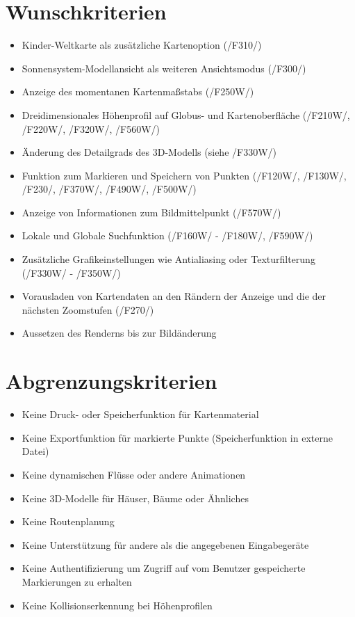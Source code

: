 \documentclass[10pt]{scrreprt}
\newcommand{\ziel}[1]{{\fontsize{9.5}{11}\textsf{/#1/}}}
\begin{document}
\section{Wunschkriterien}
\begin{itemize}
\item Kinder-Weltkarte als zusätzliche Kartenoption (\ziel{F310})
\item Sonnensystem-Modellansicht als weiteren Ansichtsmodus (\ziel{F300})
\item Anzeige des momentanen Kartenmaßstabs (\ziel{F250W})
\item Dreidimensionales Höhenprofil auf Globus- und Kartenoberfläche (\ziel{F210W}, \ziel{F220W}, \ziel{F320W}, \ziel{F560W})
\item Änderung des Detailgrads des 3D-Modells (siehe \ziel{F330W})
\item Funktion zum Markieren und Speichern von Punkten (\ziel{F120W}, \ziel{F130W}, \ziel{F230}, \ziel{F370W}, \ziel{F490W}, \ziel{F500W})
\item Anzeige von Informationen zum Bildmittelpunkt (\ziel{F570W})
\item Lokale und Globale Suchfunktion (\ziel{F160W} - \ziel{F180W}, \ziel{F590W})
\item Zusätzliche Grafikeinstellungen wie Antialiasing oder Texturfilterung (\ziel{F330W} - \ziel{F350W})
\item Vorausladen von Kartendaten an den Rändern der Anzeige und die der nächsten Zoomstufen (\ziel{F270})
\item Aussetzen des Renderns bis zur Bildänderung 
\end{itemize}

\section{Abgrenzungskriterien}
\begin{itemize}
\item Keine Druck- oder Speicherfunktion für Kartenmaterial
\item Keine Exportfunktion für markierte Punkte (Speicherfunktion in externe Datei)
\item Keine dynamischen Flüsse oder andere Animationen
\item Keine 3D-Modelle für Häuser, Bäume oder Ähnliches
\item Keine Routenplanung
\item Keine Unterstützung für andere als die angegebenen Eingabegeräte
\item Keine Authentifizierung um Zugriff auf vom Benutzer gespeicherte Markierungen zu erhalten
\item Keine Kollisionserkennung bei Höhenprofilen
\end{itemize}
\end{document}
